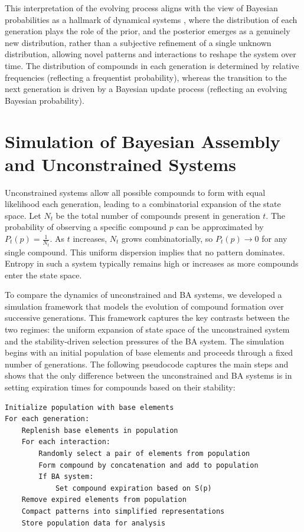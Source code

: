 \documentclass[entropy,article,submit,pdftex,moreauthors]{Definitions/mdpi}
\begin{document}
This interpretation of the evolving process aligns with the view of Bayesian probabilities as a hallmark of dynamical systems \cite{le2020equation}, where the distribution of each generation plays the role of the prior, and the posterior emerges as a genuinely new distribution, rather than a subjective refinement of a single unknown distribution, allowing novel patterns and interactions to reshape the system over time. The distribution of compounds in each generation is determined by relative frequencies (reflecting a frequentist probability), whereas the transition to the next generation is driven by a Bayesian update process (reflecting an evolving Bayesian probability).

\section{Simulation of Bayesian Assembly and Unconstrained Systems}

Unconstrained systems allow all possible compounds to form with equal likelihood each generation, leading to a combinatorial expansion of the state space. Let $N_t$ be the total number of compounds present in generation $t$. The probability of observing a specific compound $p$ can be approximated by $P_t(p) = \frac{1}{N_t}$. As $t$ increases, $N_t$ grows combinatorially, so $P_t(p) \to 0$ for any single compound. This uniform dispersion implies that no pattern dominates. Entropy in such a system typically remains high or increases as more compounds enter the state space.

To compare the dynamics of unconstrained and BA systems, we developed a simulation framework that models the evolution of compound formation over successive generations. This framework captures the key contrasts between the two regimes: the uniform expansion of state space of the unconstrained system and the stability-driven selection pressures of the BA system. The simulation begins with an initial population of base elements and proceeds through a fixed number of generations. The following pseudocode captures the main steps and shows that the only difference between the unconstrained and BA systems is in setting expiration times for compounds based on their stability:

\begin{center}
\begin{minipage}{0.9\textwidth}
\ttfamily
\begin{verbatim}
Initialize population with base elements
For each generation:
    Replenish base elements in population
    For each interaction:
        Randomly select a pair of elements from population
        Form compound by concatenation and add to population
        If BA system:
            Set compound expiration based on S(p)
    Remove expired elements from population
    Compact patterns into simplified representations
    Store population data for analysis
\end{verbatim}
\end{minipage}
\end{center}
\end{document}
